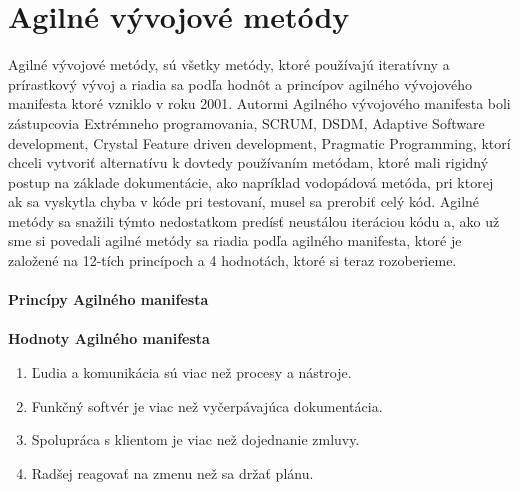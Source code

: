 \documentclass[10pt,oneside,slovak,a4paper]{article}
\begin{document}
\section{Agilné vývojové metódy}\label{Agilne}
Agilné vývojové metódy, sú všetky metódy, ktoré používajú iteratívny a prírastkový vývoj a riadia sa podľa hodnôt a princípov agilného vývojového manifesta ktoré vzniklo v roku 2001. Autormi Agilného vývojového manifesta boli zástupcovia Extrémneho programovania, SCRUM, DSDM, Adaptive Software development, Crystal Feature driven development, Pragmatic Programming, ktorí chceli vytvoriť alternatívu k dovtedy používaním metódam\cite{Agile}, ktoré mali rigidný postup na základe dokumentácie, ako napríklad vodopádová metóda, pri ktorej ak sa vyskytla chyba v kóde pri testovaní, musel sa prerobiť celý kód. Agilné metódy sa snažili týmto nedostatkom predísť neustálou iteráciou kódu a, ako už sme si povedali agilné metódy sa riadia podľa agilného manifesta, ktoré je založené na 12-tích princípoch a 4 hodnotách, ktoré si teraz rozoberieme.
\\
\\
\textbf{Princípy Agilného manifesta}
\cite{Agile_principles}
\\
\\
\textbf{Hodnoty Agilného manifesta}
\begin{enumerate}
\item Ľudia a komunikácia sú viac než procesy a nástroje.
\item Funkčný softvér je viac než vyčerpávajúca dokumentácia.
\item Spolupráca s klientom je viac než dojednanie zmluvy.
\item Radšej reagovať na zmenu než sa držať plánu.\cite{Agile_Values}
\end{enumerate}
\end{document}

